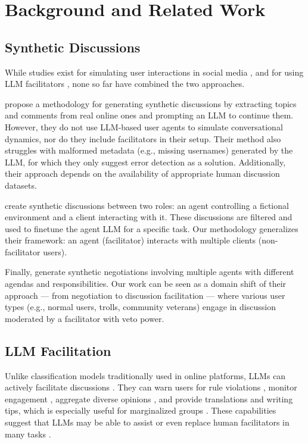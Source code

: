 %
\section{Background and Related Work}

\subsection{Synthetic Discussions}
\label{ssec:related:discussions}

While studies exist for simulating user interactions in social media \cite{park_simulacra, mou_2024, tornberg_2023, y_social, balog_2024}, and for using LLM facilitators \cite{kim_et_al_chatbot, cho-etal-2024-language}, none so far have combined the two approaches. 


\citet{balog_2024} propose a methodology for generating synthetic discussions by extracting topics and comments from real online ones and prompting an LLM to continue them. However, they do not use LLM-based user agents to simulate conversational dynamics, nor do they include facilitators in their setup. Their method also struggles with malformed metadata (e.g., missing usernames) generated by the LLM, for which they only suggest error detection as a solution. Additionally, their approach depends on the availability of appropriate human discussion datasets.

\citet{ulmer2024} create synthetic discussions between two roles: an agent controlling a fictional environment and a client interacting with it. These discussions are filtered and used to finetune the agent LLM for a specific task. Our methodology generalizes their framework: an agent (facilitator) interacts with multiple clients (non-facilitator users).

Finally, \citet{abdelnabi_negotiations} generate synthetic negotiations involving multiple agents with different agendas and responsibilities. Our work can be seen as a domain shift of their approach --- from negotiation to discussion facilitation --- where various user types (e.g., normal users, trolls, community veterans) engage in discussion moderated by a facilitator with veto power.


\subsection{LLM Facilitation}

Unlike classification models traditionally used in online platforms, LLMs can actively facilitate discussions \cite{korre2025evaluation}. They can warn users for rule violations \cite{Kumar_AbuHashem_Durumeric_2024}, monitor engagement \cite{schroeder-etal-2024-fora}, aggregate diverse opinions \cite{small-polis-llm}, and provide translations and writing tips, which is especially useful for marginalized groups \cite{Tsai2024Generative}. These capabilities suggest that LLMs may be able to assist or even replace human facilitators in many tasks \cite{small-polis-llm, seering_self_moderation}.

